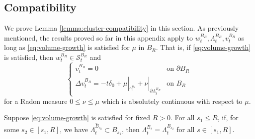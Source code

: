 \documentclass[12pt]{amsart}
\numberwithin{equation}{section}
\newcommand{\mclS}[2]{\hyperref[eq:super-solutions]{\mathcal{S}^{#1}_{#2}}}
\newcommand{\lss}[2]{\hyperref[eq:least-super-solution]{w^{#1}_{#2}}}
\newcommand{\cluster}[2]{\hyperref[eq:non-co-set]{\mathit{\Lambda}^{#1}_{#2}}}
\newcommand{\odometer}[2]{\hyperref[eq:limit-odometer]{v^{#1}_{#2}}}
\begin{document}
	
	\subsection{Compatibility}
	We prove Lemma \ref{lemma:cluster-compatibility} in this section.
	As previously mentioned, the results proved so far in this appendix apply to $\lss{B_R}{t}, \cluster{B_R}{t}, \odometer{B_R}{t}$ as long as \eqref{eq:volume-growth}
	is satisfied for $\mu$ in $B_R$. That is, if \eqref{eq:volume-growth} is satisfied, then $\lss{B_R}{t} \in \mclS{B_R}{t}$ and
	\begin{equation} \label{eq:laplacian-of-v-general}
	\begin{cases}
	\odometer{B_R}{t} = 0  &\mbox{on $\partial B_R$} \\
	\Delta \odometer{B_R}{t} = -t \delta_0 + \mu |_{_{\cluster{B_R}{t}}} + \nu |_{\partial \cluster{B_R}{t}} &\mbox{on $B_R$}
	\end{cases}
	\end{equation}
	for a Radon measure $0 \leq \nu \leq \mu$ which is absolutely continuous with respect to $\mu$. 
	
	
	
	
	\begin{lemma} \label{lemma:appendix-cluster-compatibility}
		Suppose \eqref{eq:volume-growth} is satisfied for fixed $R > 0$. 
		For all $s_1 \leq R$, if, for some $s_2 \in [s_1, R]$, we have $\overline{\cluster{B_{s_2}}{t}} \subset B_{s_1}$, 
		then  $\cluster{B_{s}}{t} = \cluster{B_{s_2}}{t}$ for all $s \in [s_1, R]$.
	\end{lemma}
	
\end{document}
